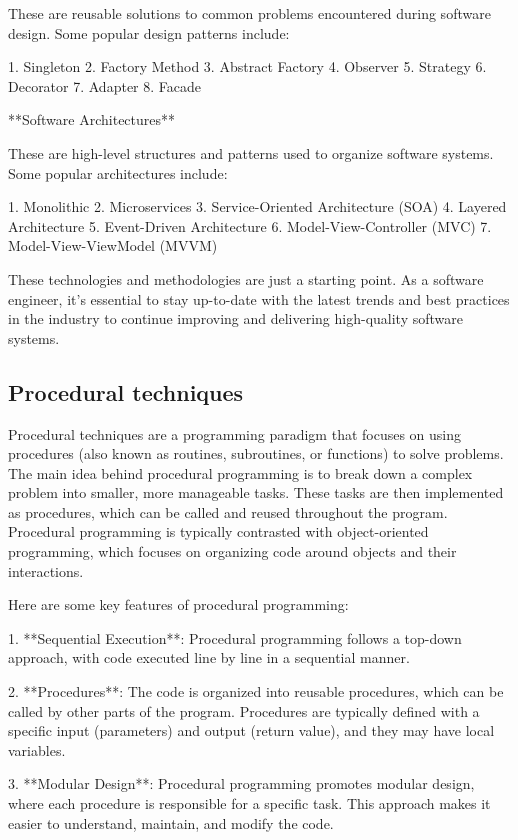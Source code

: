 \documentclass{article}
\begin{document}
These are reusable solutions to common problems encountered during software design. Some popular design patterns include:

1. Singleton
2. Factory Method
3. Abstract Factory
4. Observer
5. Strategy
6. Decorator
7. Adapter
8. Facade

**Software Architectures**

These are high-level structures and patterns used to organize software systems. Some popular architectures include:

1. Monolithic
2. Microservices
3. Service-Oriented Architecture (SOA)
4. Layered Architecture
5. Event-Driven Architecture
6. Model-View-Controller (MVC)
7. Model-View-ViewModel (MVVM)

These technologies and methodologies are just a starting point. As a software engineer, it's essential to stay up-to-date with the latest trends and best practices in the industry to continue improving and delivering high-quality software systems.


\subsection{Procedural techniques}

Procedural techniques are a programming paradigm that focuses on using procedures (also known as routines, subroutines, or functions) to solve problems. The main idea behind procedural programming is to break down a complex problem into smaller, more manageable tasks. These tasks are then implemented as procedures, which can be called and reused throughout the program. Procedural programming is typically contrasted with object-oriented programming, which focuses on organizing code around objects and their interactions.

Here are some key features of procedural programming:

1. **Sequential Execution**: Procedural programming follows a top-down approach, with code executed line by line in a sequential manner.

2. **Procedures**: The code is organized into reusable procedures, which can be called by other parts of the program. Procedures are typically defined with a specific input (parameters) and output (return value), and they may have local variables.

3. **Modular Design**: Procedural programming promotes modular design, where each procedure is responsible for a specific task. This approach makes it easier to understand, maintain, and modify the code.
\end{document}
